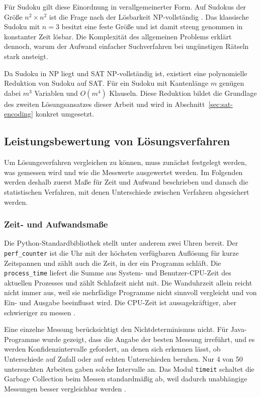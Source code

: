 Für Sudoku gilt diese Einordnung in verallgemeinerter Form. Auf Sudokus der Größe $n^2 \times n^2$ ist die Frage nach der Lösbarkeit NP-vollständig . Das klassische Sudoku mit $n = 3$ besitzt eine feste Größe und ist damit streng genommen in konstanter Zeit lösbar. Die Komplexität des allgemeinen Problems erklärt dennoch, warum der Aufwand einfacher Suchverfahren bei ungünstigen Rätseln stark ansteigt.

Da Sudoku in NP liegt und SAT NP-vollständig ist, existiert eine polynomielle Reduktion von Sudoku auf SAT. Für ein Sudoku mit Kantenlänge $m$ genügen dabei $m^3$ Variablen und $O(m^4)$ Klauseln. Diese Reduktion bildet die Grundlage des zweiten Lösungsansatzes dieser Arbeit und wird in Abschnitt~\ref{sec:sat-encoding} konkret umgesetzt.



\subsection{Leistungsbewertung von Lösungsverfahren}\label{sec:leistungsbewertung}
Um Lösungsverfahren vergleichen zu können, muss zunächst festgelegt werden, was gemessen wird und wie die Messwerte ausgewertet werden. Im Folgenden werden deshalb zuerst Maße für Zeit und Aufwand beschrieben und danach die statistischen Verfahren, mit denen Unterschiede zwischen Verfahren abgesichert werden.
\subsubsection{Zeit- und Aufwandsmaße}\label{sec:zeitmasse}
Die Python-Standardbibliothek stellt unter anderem zwei Uhren bereit. Der \texttt{perf\_counter} ist die Uhr mit der höchsten verfügbaren Auflösung für kurze Zeitspannen und zählt auch die Zeit, in der ein Programm schläft. Die \texttt{process\_time} liefert die Summe aus System- und Benutzer-CPU-Zeit des aktuellen Prozesses und zählt Schlafzeit nicht mit.  Die Wanduhrzeit allein reicht nicht immer aus, weil sie mehrfädige Programme nicht sinnvoll vergleicht und von Ein- und Ausgabe beeinflusst wird. Die CPU-Zeit ist aussagekräftiger, aber schwieriger zu messen .

Eine einzelne Messung berücksichtigt den Nichtdeterminismus nicht. Für Java-Programme wurde gezeigt, dass die Angabe der besten Messung irreführt, und es werden Konfidenzintervalle gefordert, an denen sich erkennen lässt, ob Unterschiede auf Zufall oder auf echten Unterschieden beruhen. Nur 4 von 50 untersuchten Arbeiten gaben solche Intervalle an.  Das Modul \texttt{timeit} schaltet die Garbage Collection beim Messen standardmäßig ab, weil dadurch unabhängige Messungen besser vergleichbar werden .

